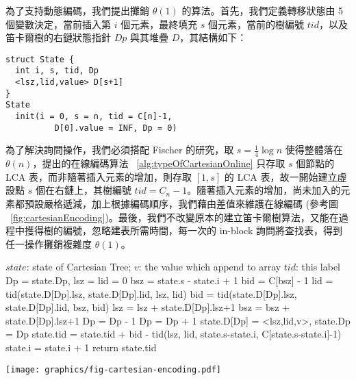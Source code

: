 \documentclass{gapd}
\begin{document}
為了支持動態編碼，我們提出攤銷 $\theta(1)$ 的算法。首先，我們定義轉移狀態由 5 個變數決定，當前插入第 $i$ 個元素，最終填充 $s$ 個元素，當前的樹編號 $\mathit{tid}$，以及笛卡爾樹的右鏈狀態指針 $Dp$ 與其堆疊 $D$，其結構如下：

\begin{lstlisting}
struct State {
  int i, s, tid, Dp
  <lsz,lid,value> D[s+1]
}
State 
  init(i = 0, s = n, tid = C[n]-1, 
          D[0].value = INF, Dp = 0)
\end{lstlisting}

為了解決詢問操作，我們必須搭配 Fischer \cite{fischer} 的研究，取 $s = \frac{1}{4} \log n$ 使得整體落在 $\theta(n)$，提出的在線編碼算法 ~\ref{alg:typeOfCartesianOnline} 只存取 $s$ 個節點的 LCA 表，而非隨著插入元素的增加，則存取 $[1, s]$ 的 LCA 表，故一開始建立虛設點 $s$ 個在右鏈上，其樹編號 $\mathit{tid} = C_n - 1$。隨著插入元素的增加，尚未加入的元素都預設嚴格遞減，加上根據編碼順序，我們藉由差值來維護在線編碼 (參考圖 ~\ref{fig:cartesianEncoding})。最後，我們不改變原本的建立笛卡爾樹算法，又能在過程中擭得樹的編號，忽略建表所需時間，每一次的 in-block 詢問將查找表，得到任一操作攤銷複雜度 $\theta(1)$。

\begin{algorithm*}
  \caption{Online Type of Cartesian Tree}
  \label{alg:typeOfCartesianOnline}
  \begin{algorithmic}[1]
  \Require
      $\mathit{state}$: state of Cartesian Tree;
      $v$: the value which append to array
  \Ensure
      $\mathit{tid}$: this label
  \State Dp = state.Dp, lsz = lid = 0
  \State bsz = state.s - state.i + 1
  \State bid = C[bsz] - 1 
    \State lid = tid(state.D[Dp].lsz, state.D[Dp].lid, lsz, lid)
    \State bid = tid(state.D[Dp].lsz, state.D[Dp].lid, bsz, bid)
    \State lsz = lsz + state.D[Dp].lsz+1
    \State bsz = bsz + state.D[Dp].lsz+1
    \State Dp = Dp - 1
  \EndWhile
  \State Dp = Dp + 1
  \State state.D[Dp] = <lsz,lid,v>, state.Dp = Dp
  \State state.tid = state.tid + bid - tid(lsz, lid, state.s-state.i, C[state.s-state.i]-1)
  \State state.i = state.i + 1
  \State return state.tid
  \end{algorithmic}
\end{algorithm*}

\begin{figure*}
  \centering
  \texttt{[image: graphics/fig-cartesian-encoding.pdf]}
  \caption{每個區塊有 $s$ 個元素，初始情況虛設 $s$ 個點在右鏈，則具有 $s$ 個節點的 BST，其編號 $\text{tid}_0 = C_s - 1$。當插入第 $i$ 個元素時，當前編號為 $\text{tid}_i$，以節點 $A$ 為根的樹編號為 $A.\text{tid}$，若第 $i+1$ 個元素值為 $x$，其將會翻轉到 $A$ 之上，而 $A$ 成為 $x$ 的左子節點，翻轉過程中計算得到 $A.\text{tid}$，而以 $x$ 為根的樹將虛設 $s-(i+1)$ 個節點在其右鏈，最後得到 $x.\text{tid}$。根據字典順序，我們將得到 $\text{tid}_{i+1} = \text{tid}_{i} + (x.\text{tid} - A.\text{tid})$。}
  \label{fig:cartesianEncoding}
\end{figure*}
\end{document}
